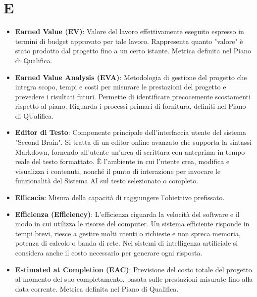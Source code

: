 \documentclass[11pt,a4paper]{article}
\begin{document}
\section*{E}
\begin{itemize}

\item \textbf{Earned Value (EV)}: Valore del lavoro effettivamente eseguito espresso in termini di budget approvato per tale lavoro. Rappresenta quanto "valore" è stato prodotto dal progetto fino a un certo istante. Metrica definita nel Piano di Qualifica.

\item \textbf{Earned Value Analysis (EVA)}: Metodologia di gestione del progetto che integra scopo, tempi e costi per misurare le prestazioni del progetto e prevedere i risultati futuri. Permette di identificare precocemente scostamenti rispetto al piano. Riguarda i processi primari di fornitura, definiti nel Piano di QUalifica.

\item \textbf{Editor di Testo}: Componente principale dell'interfaccia utente del sistema "Second Brain". Si tratta di un editor online avanzato che supporta la sintassi Markdown, fornendo all'utente un'area di scrittura con anteprima in tempo reale del testo formattato. È l'ambiente in cui l'utente crea, modifica e visualizza i contenuti, nonché il punto di interazione per invocare le funzionalità del Sistema AI sul testo selezionato o completo.

\item \textbf{Efficacia}: Misura della capacità di raggiungere l'obiettivo prefissato.

\item \textbf{Efficienza (Efficiency)}: L’efficienza riguarda la velocità del software e il modo in cui utilizza le risorse del computer. Un sistema efficiente risponde in tempi brevi, riesce a gestire molti utenti o richieste e non spreca memoria, potenza di calcolo o banda di rete. Nei sistemi di intelligenza artificiale si considera anche il costo necessario per generare ogni risposta.

\item \textbf{Estimated at Completion (EAC)}: Previsione del costo totale del progetto al momento del suo completamento, basata sulle prestazioni misurate fino alla data corrente. Metrica definita nel Piano di Qualifica.

\end{itemize}
\newpage
\end{document}
